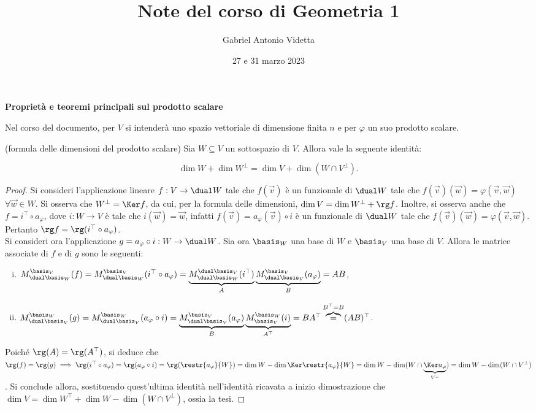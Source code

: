 \documentclass[11pt]{article}
\title{\textbf{Note del corso di Geometria 1}}
\author{Gabriel Antonio Videtta}
\date{27 e 31 marzo 2023}
\begin{document}
	
	\maketitle
	
	\begin{center}
		\Large \textbf{Proprietà e teoremi principali sul prodotto scalare}
	\end{center}
	
	\begin{note}
		Nel corso del documento, per $V$ si intenderà uno spazio vettoriale di dimensione
		finita $n$ e per $\varphi$ un suo prodotto scalare.
	\end{note}
	
	\begin{proposition} (formula delle dimensioni del prodotto scalare)
		Sia $W \subseteq V$ un sottospazio di $V$. Allora vale la seguente identità:
		
		\[ \dim W + \dim W^\perp = \dim V + \dim (W \cap V^\perp). \]
	\end{proposition}

	\begin{proof}
		Si consideri l'applicazione lineare $f : V \to \dual W$ tale che $f(\vec v)$ è un funzionale di $\dual W$ tale che
		$f(\vec v)(\vec w) = \varphi(\vec v, \vec w)$ $\forall \vec w \in W$. Si osserva che $W^\perp = \Ker f$, da cui,
		per la formula delle dimensioni, $\dim V = \dim W^\perp + \rg f$. Inoltre, si osserva anche che
		$f = i^\top \circ a_\varphi$, dove $i : W \to V$ è tale che $i(\vec w) = \vec w$, infatti $f(\vec v) = a_\varphi(\vec v) \circ i$ è un funzionale di $\dual W$ tale che $f(\vec v)(\vec w) = \varphi(\vec v, \vec w)$. Pertanto
		$\rg f = \rg (i^\top \circ a_\varphi)$. \\
		
		Si consideri ora l'applicazione $g = a_\varphi \circ i : W \to \dual W$. Sia ora $\basis_W$ una base di $W$ e
		$\basis_V$ una base di $V$. Allora le matrice associate di $f$ e di $g$ sono le seguenti:
		
		\begin{enumerate}[(i)]
			\item $M_{\dual \basis_W}^{\basis_V}(f) = M_{\dual \basis_W}^{\basis_V}(i^\top \circ a_\varphi) =
			\underbrace{M_{\dual \basis_W}^{\dual \basis_V}(i^\top)}_A \underbrace{M_{\dual \basis_V}^{\basis_V}(a_\varphi)}_B = AB$,
			\item $M_{\dual \basis_V}^{\basis_W}(g) = M_{\dual \basis_V}^{\basis_W}(a_\varphi \circ i) =
			\underbrace{M_{\dual \basis_V}^{\basis_V}(a_\varphi)}_B \underbrace{M_{\basis_V}^{\basis_W}(i)}_{A^\top} = BA^\top \overbrace{=}^{B^\top = B} (AB)^\top$.
		\end{enumerate}
	
		Poiché $\rg(A) = \rg(A^\top)$, si deduce che $\rg(f) = \rg(g) \implies \rg(i^\top \circ a_\varphi) = \rg(a_\varphi \circ i) = \rg(\restr{a_\varphi}{W}) = \dim W - \dim \Ker \restr{a_\varphi}{W} = \dim W - \dim (W \cap \underbrace{\Ker a_\varphi}_{V^\perp}) = \dim W - \dim (W \cap V^\perp)$. Si conclude allora, sostituendo quest'ultima
		identità nell'identità ricavata a inizio dimostrazione che $\dim V = \dim W^\top + \dim W - \dim (W \cap V^\perp)$,
		ossia la tesi.
	\end{proof}
\end{document}
